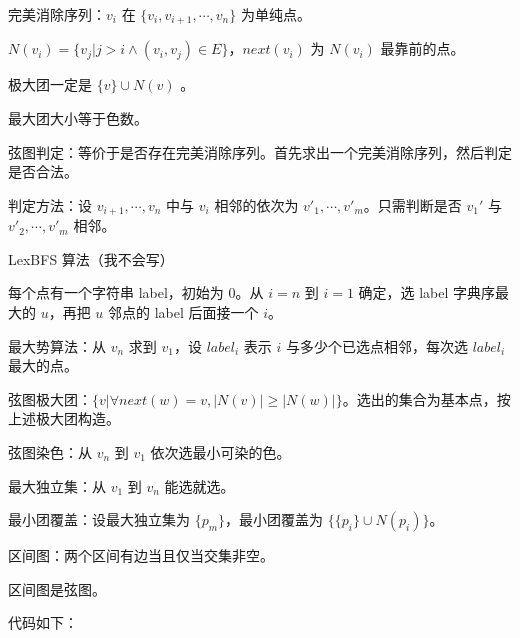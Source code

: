 \documentclass[12pt]{ctexart}
\begin{document}
完美消除序列：$v_i$ 在 $\{v_i,v_{i+1},\cdots,v_n\}$ 为单纯点。

$N(v_i)=\{v_j|j>i\land (v_i,v_j)\in E\}$，$next(v_i)$ 为 $N(v_i)$ 最靠前的点。

极大团一定是 $\{v\}\cup N(v)$ 。

最大团大小等于色数。

弦图判定：等价于是否存在完美消除序列。首先求出一个完美消除序列，然后判定是否合法。

判定方法：设 $v_{i+1},\cdots,v_n$ 中与 $v_i$ 相邻的依次为 $v'_1,\cdots,v'_m$。只需判断是否 $v_1'$ 与 $v'_2,\cdots,v'_m$ 相邻。

LexBFS 算法（我不会写）

每个点有一个字符串 label，初始为 $0$。从 $i=n$ 到 $i=1$ 确定，选 label 字典序最大的 $u$，再把 $u$ 邻点的 label 后面接一个 $i$。

最大势算法：从 $v_n$ 求到 $v_1$，设 $label_i$ 表示 $i$ 与多少个已选点相邻，每次选 $label_i$ 最大的点。

弦图极大团：$\{v|\forall next(w)=v,|N(v)|\ge |N(w)|\}$。选出的集合为基本点，按上述极大团构造。

弦图染色：从 $v_n$ 到 $v_1$ 依次选最小可染的色。

最大独立集：从 $v_1$ 到 $v_n$ 能选就选。

最小团覆盖：设最大独立集为 $\{p_m\}$，最小团覆盖为 $\{\{p_i\}\cup N(p_i)\}$。

区间图：两个区间有边当且仅当交集非空。

区间图是弦图。

代码如下：
\end{document}
